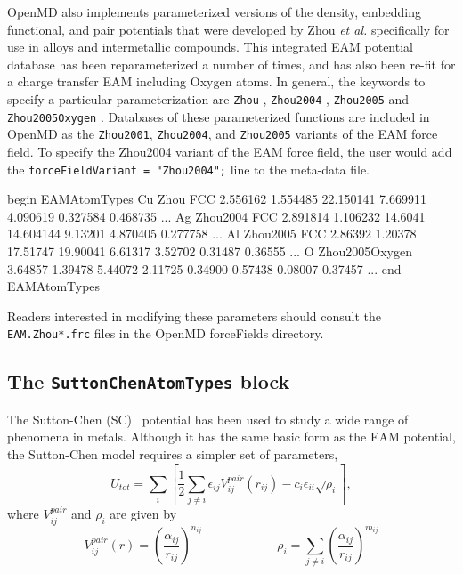 \documentclass[letterpaper]{report}
\begin{document}
OpenMD also implements parameterized versions of the density,
embedding functional, and pair potentials that were developed by Zhou
\textit{et
  al.}\cite{Wadley:2001fk,Zhou:2001fj,Zhou:2004yq,Zhou:2005rt}
specifically for use in alloys and intermetallic compounds.  This
integrated EAM potential database has been reparameterized a number of
times,\cite{Wadley:2001fk,Zhou:2001fj,Zhou:2004yq} and has also been
re-fit for a charge transfer EAM including Oxygen
atoms.\cite{Zhou:2005rt} In general, the keywords to specify a
particular parameterization are \texttt{Zhou}
\cite{Wadley:2001fk,Zhou:2001fj}, \texttt{Zhou2004}
\cite{Zhou:2004yq}, \texttt{Zhou2005} and \texttt{Zhou2005Oxygen}
\cite{Zhou:2005rt}. Databases of these parameterized functions are
included in OpenMD as the {\tt Zhou2001}, {\tt Zhou2004}, and
{\tt Zhou2005} variants of the EAM force field.  To specify the
Zhou2004 variant of the EAM force field, the user would add the
{\tt forceFieldVariant = "Zhou2004";} line to the meta-data file.

\begin{code}[caption={[An example of a EAMAtomTypes block using
parameterized functions.] A
more complicated example of a EAMAtomTypes block (each line is truncated).}, 
label={sch:EAMAtomTypes2}]
begin EAMAtomTypes
Cu Zhou FCC 2.556162 1.554485 22.150141 7.669911 4.090619 0.327584 0.468735 ...
Ag Zhou2004 FCC 2.891814 1.106232 14.6041   14.604144 9.13201  4.870405 0.277758 ...
Al Zhou2005 FCC 2.86392 1.20378 17.51747 19.90041 6.61317 3.52702 0.31487 0.36555 ...
O  Zhou2005Oxygen  3.64857 1.39478 5.44072 2.11725 0.34900 0.57438 0.08007 0.37457 ...
end EAMAtomTypes
\end{code}

Readers interested in modifying these parameters should consult the
\texttt{EAM.Zhou*.frc} files in the OpenMD forceFields directory.

\subsection{\label{section:ffSC}The {\tt SuttonChenAtomTypes} block}

The Sutton-Chen (SC)~\cite{Chen90} potential has been used to
study a wide range of phenomena in metals.  Although it has the same
basic form as the EAM potential, the Sutton-Chen model requires
a simpler set of parameters,
\begin{equation}
\label{eq:SCP1}
U_{tot}=\sum _{i}\left[ \frac{1}{2}\sum _{j\neq
i}\epsilon_{ij}V^{pair}_{ij}(r_{ij})-c_{i}\epsilon_{ii}\sqrt{\rho_{i}}\right] ,
\end{equation}
 where $V^{pair}_{ij}$ and $\rho_{i}$ are given by 
\begin{equation}
\label{eq:SCP2}
V^{pair}_{ij}(r)=\left(
\frac{\alpha_{ij}}{r_{ij}}\right)^{n_{ij}} \hspace{1in} \rho_{i}=\sum_{j\neq i}\left(
\frac{\alpha_{ij}}{r_{ij}}\right) ^{m_{ij}}
\end{equation}
\end{document}
